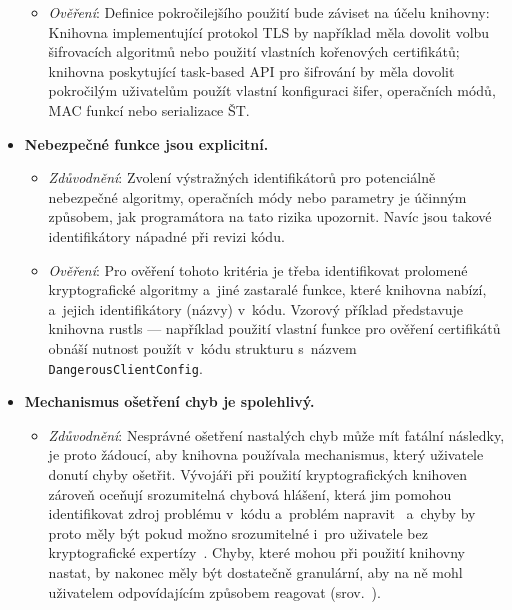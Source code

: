 \begin{itemize}
\begin{itemize}[beginpenalty=10000]
        \item \textit{Ověření}: Definice pokročilejšího použití bude záviset na účelu knihovny: Knihovna implementující protokol TLS by například měla dovolit volbu šifrovacích algoritmů nebo použití vlastních kořenových certifikátů; knihovna poskytující task-based API pro šifrování by měla dovolit pokročilým uživatelům použít vlastní konfiguraci šifer, operačních módů, MAC funkcí nebo serializace ŠT.
    \end{itemize}
    
    \item \textbf{Nebezpečné funkce jsou explicitní.} 
    \begin{itemize}[beginpenalty=10000]
        \item \textit{Zdůvodnění}: Zvolení výstražných identifikátorů pro potenciálně nebezpečné algoritmy, operačních módy nebo parametry je účinným způsobem, jak programátora na tato rizika upozornit. Navíc jsou takové identifikátory nápadné při revizi kódu.

        \item \textit{Ověření}: Pro ověření tohoto kritéria je třeba identifikovat prolomené kryptografické algoritmy a~jiné zastaralé funkce, které knihovna nabízí, a~jejich identifikátory (názvy) v~kódu. Vzorový příklad představuje knihovna rustls --- například použití vlastní funkce pro ověření certifikátů obnáší nutnost použít v~kódu strukturu s~názvem \texttt{DangerousClientConfig}.
    \end{itemize}
    
    \item \textbf{Mechanismus ošetření chyb je spolehlivý.} 
    \begin{itemize}[beginpenalty=10000]
        \item \textit{Zdůvodnění}: Nesprávné ošetření nastalých chyb může mít fatální následky, je proto žádoucí, aby knihovna používala mechanismus, který uživatele donutí chyby ošetřit. Vývojáři při použití kryptografických knihoven zároveň oceňují srozumitelná chybová hlášení, která jim pomohou identifikovat zdroj problému v~kódu a~problém napravit~\cite{fluentcrypto} a~chyby by proto měly být pokud možno srozumitelné i~pro uživatele bez kryptografické expertízy~\cite{comparative2023}. Chyby, které mohou při použití knihovny nastat, by nakonec měly být dostatečně granulární, aby na ně mohl uživatelem odpovídajícím způsobem reagovat (srov.~\cite{pcd-issue-320}).


\end{itemize}
\end{itemize}
